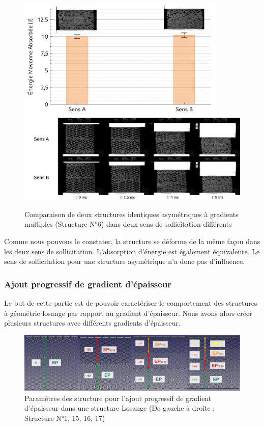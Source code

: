 \documentclass[a4paper]{article}
\begin{document}
	\begin{figure}[H]
		\centering
		\includegraphics[width=10cm]{Images/7/7_4/7_4_6/comp_directsol.pdf}
		\includegraphics[width=16cm]{Images/7/7_4/7_4_6/instants.pdf}
		\caption{Comparaison de deux structures identiques asymétriques à gradients multiples (Structure N°6) dans deux sens de sollicitation différents}
	\end{figure}

	Comme nous pouvons le constater, la structure se déforme de la même façon dans les deux sens de sollicitation. L'absorption d'énergie est également équivalente. Le sens de sollicitation pour une structure asymétrique n'a donc pas d'influence.
	\newpage
	
	\subsubsection{Ajout progressif de gradient d'épaisseur}
	\hspace{0.5cm}Le but de cette partie est de pouvoir caractériser le comportement des structures à géométrie losange par rapport au gradient d'épaisseur. Nous avons alors créer plusieurs structures avec différents gradients d'épaisseur.
	
	\begin{figure}[H]
		\centering
		\includegraphics[width=14cm]{Images/7/7_4/7_4_7/ajout_gradep.pdf}
		\caption{Paramètres des structure pour l'ajout progressif de gradient d'épaisseur dans une structure Losange (De gauche à droite : Structure N°1, 15, 16, 17)}
	\end{figure}
\end{document}
